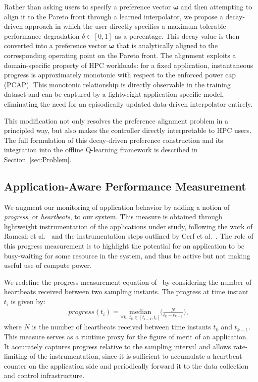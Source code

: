 Rather than asking users to specify a preference vector $\boldsymbol{\omega}$ and then attempting to align it to the Pareto front through a learned interpolator, we propose a decay-driven approach in which the user directly specifies a maximum tolerable performance degradation $\delta \in [0,1]$ as a percentage. This decay value is then converted into a preference vector 
$\boldsymbol{\omega}$ that is analytically aligned to the corresponding operating point on the Pareto front. The alignment exploits a domain-specific property of HPC workloads: for a fixed application, instantaneous progress is approximately monotonic with respect to the enforced power cap (PCAP). This monotonic relationship is directly observable in the training dataset and can be captured by a lightweight application-specific model, eliminating the need for an episodically updated data-driven 
interpolator entirely.

This modification not only resolves the preference alignment problem in a principled way, but also makes the controller directly interpretable to HPC users. The full formulation of this decay-driven preference construction and its integration into the offline Q-learning framework is described in Section~\ref{sec:Problem}.

\subsection{Application-Aware Performance Measurement}
\label{subsec:Performance_Measurement}

We augment our monitoring of application behavior by adding a 
notion of \textit{progress}, or \textit{heartbeats}, to our 
system. This measure is obtained through lightweight 
instrumentation of the applications under study, following the 
work of Ramesh et al.~\cite{ramesh2019understanding} and the 
instrumentation steps outlined by Cerf et 
al.~\cite{rutten2021sustaining}. The role of this progress 
measurement is to highlight the potential for an application to 
be busy-waiting for some resource in the system, and thus be 
active but not making useful use of compute power.

We redefine the progress measurement equation 
of~\cite{ramesh2019understanding} by considering the number of 
heartbeats received between two sampling instants. The progress 
at time instant $t_i$ is given by:
\begin{equation}
\begin{aligned}
progress(t_i) = \underset{\forall k,\, t_k \in 
[t_{i-1},t_i]}{\text{median}}\bigg(\frac{N}{t_k - t_{k-1}} 
\bigg),
\end{aligned}
\label{eq:progress-calculation}
\end{equation}
where $N$ is the number of heartbeats received between time 
instants $t_k$ and $t_{k-1}$. This measure serves as a 
runtime proxy for the figure of merit of an application. It 
accurately captures progress relative to the sampling interval 
and allows rate-limiting of the instrumentation, since it is 
sufficient to accumulate a heartbeat counter on the application 
side and periodically forward it to the data collection and 
control infrastructure.

